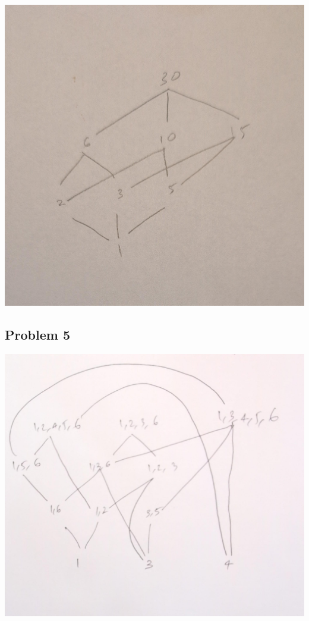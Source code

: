 \documentclass[a4paper]{report}
\begin{document}
\includegraphics[scale=.2]{4}

\subsection*{Problem 5}
\includegraphics[scale=.2]{5}
\end{document}
